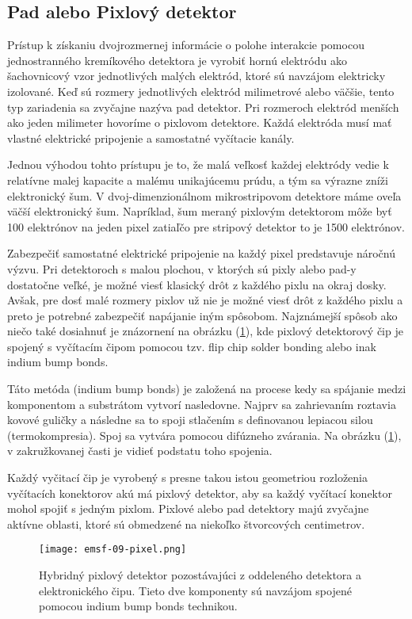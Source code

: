 \documentclass[../../main.tex]{subfiles}
\begin{document}
\subsection{Pad alebo Pixlový detektor}
Prístup k získaniu dvojrozmernej informácie o polohe interakcie pomocou jednostranného kremíkového detektora je vyrobiť hornú elektródu ako šachovnicový vzor jednotlivých malých elektród, ktoré sú navzájom elektricky izolované. Keď sú rozmery jednotlivých elektród milimetrové alebo väčšie, tento typ zariadenia sa zvyčajne nazýva pad detektor. Pri rozmeroch elektród menších ako jeden milimeter hovoríme o pixlovom detektore. 
Každá elektróda musí mať vlastné elektrické pripojenie a samostatné vyčítacie kanály.

Jednou výhodou tohto prístupu je to, že malá veľkosť každej elektródy vedie k relatívne malej kapacite a malému unikajúcemu prúdu, a tým sa výrazne zníži elektronický šum. V  dvoj-dimenzionálnom mikrostripovom detektore máme oveľa väčší elektronický šum. Napríklad, šum meraný pixlovým detektorom môže byť 100 elektrónov na jeden pixel zatiaľčo pre stripový detektor to je 1500 elektrónov.

Zabezpečiť samostatné elektrické pripojenie na každý pixel predstavuje náročnú výzvu. Pri detektoroch s malou plochou, v ktorých sú pixly alebo pad-y dostatočne veľké, je možné viesť klasický drôt z každého pixlu na okraj dosky. Avšak, pre dosť malé rozmery pixlov už nie je možné viesť drôt z každého pixlu a preto je potrebné zabezpečiť napájanie iným spôsobom. Najznámejší spôsob ako niečo také dosiahnuť je znázornení na obrázku (\ref{em9:fig:pixel}), kde pixlový detektorový čip je spojený s vyčítacím čipom pomocou tzv. flip chip solder bonding alebo inak indium bump bonds. 

Táto metóda (indium bump bonds) je založená na procese kedy sa spájanie medzi komponentom a substrátom vytvorí nasledovne. Najprv sa zahrievaním roztavia kovové guličky a následne sa to spoji stlačením s definovanou lepiacou silou (termokompresia). Spoj sa vytvára pomocou difúzneho zvárania. Na obrázku (\ref{em9:fig:pixel}), v zakružkovanej časti je vidieť podstatu toho spojenia.

Každý vyčitací čip je vyrobený s presne takou istou geometriou rozloženia vyčítacích konektorov akú má pixlový detektor, aby sa každý vyčítací konektor mohol spojiť s jedným
pixlom. Pixlové alebo pad detektory majú zvyčajne aktívne oblasti, ktoré sú obmedzené na niekoľko štvorcových centimetrov.

\begin{figure}[!h]
\texttt{[image: emsf-09-pixel.png]}
\centering
\caption{Hybridný pixlový detektor pozostávajúci z oddeleného detektora a elektronického čipu. Tieto dve komponenty sú navzájom spojené pomocou indium bump bonds technikou.}
\label{em9:fig:pixel}
\end{figure}
\end{document}
